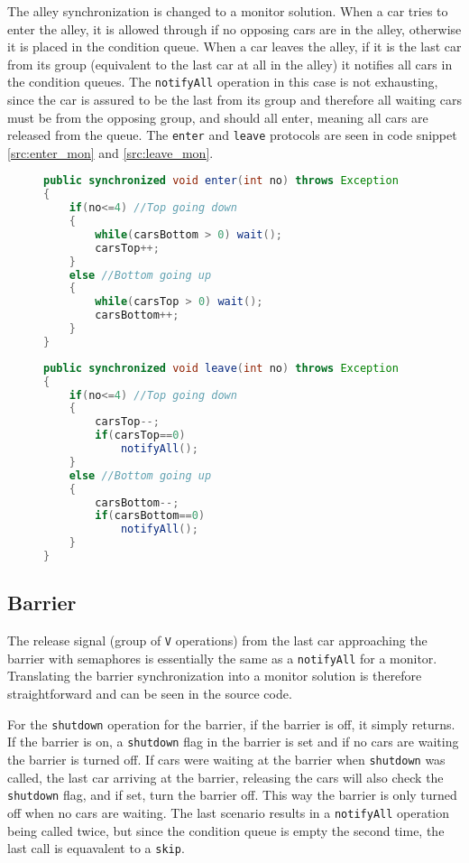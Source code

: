 The alley synchronization is changed to a monitor solution. When a car tries to enter the alley, it is allowed through if no opposing cars are in the alley, otherwise it is placed in the condition queue. When a car leaves the alley, if it is the last car from its group (equivalent to the last car at all in the alley) it notifies all cars in the condition queues. The \texttt{notifyAll} operation in this case is not exhausting, since the car is assured to be the last from its group and therefore all waiting cars must be from the opposing group, and should all enter, meaning all cars are released from the queue. The \texttt{enter} and \texttt{leave} protocols are seen in code snippet \ref{src:enter_mon} and \ref{src:leave_mon}.
\begin{figure}[H]
\begin{multicols}{2}
\begin{lstlisting}[language=java, caption=\texttt{enter} protocol, label=src:enter_mon]
public synchronized void enter(int no) throws Exception
{
    if(no<=4) //Top going down
    {   
        while(carsBottom > 0) wait();
        carsTop++;
    }
    else //Bottom going up
    { 
        while(carsTop > 0) wait();
        carsBottom++;
    }
}
\end{lstlisting}
\begin{lstlisting}[language=java, caption=\texttt{leave} protocol, label=src:leave_mon]
public synchronized void leave(int no) throws Exception
{
    if(no<=4) //Top going down
    {
        carsTop--;
        if(carsTop==0)
            notifyAll();
    }
    else //Bottom going up
    { 
        carsBottom--;
        if(carsBottom==0)
            notifyAll();
    }
}
\end{lstlisting}
\end{multicols}
\end{figure}


\subsection{Barrier}

The release signal (group of \texttt{V} operations) from the last car approaching the barrier with semaphores is essentially the same as a \texttt{notifyAll} for a monitor. Translating the barrier synchronization into a monitor solution is therefore straightforward and can be seen in the source code.

For the \texttt{shutdown} operation for the barrier, if the barrier is off, it simply returns. If the barrier is on, a \texttt{shutdown} flag in the barrier is set and if no cars are waiting the barrier is turned off. If cars were waiting at the barrier when \texttt{shutdown} was called, the last car arriving at the barrier, releasing the cars will also check the \texttt{shutdown} flag, and if set, turn the barrier off. This way the barrier is only turned off when no cars are waiting. The last scenario results in a \texttt{notifyAll} operation being called twice, but since the condition queue is empty the second time, the last call is equavalent to a \texttt{skip}.

